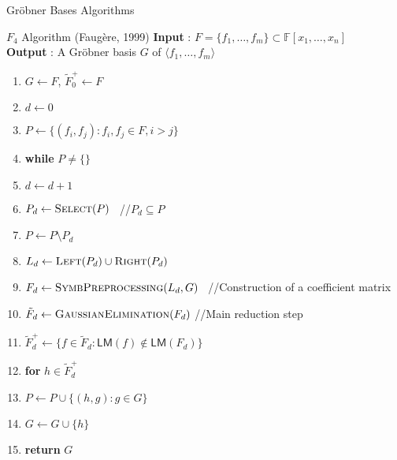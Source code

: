 \documentclass{beamer}
\newcommand{\Field}{\mathbb{F}}
\newcommand{\Ideal}[1]{\langle #1 \rangle}
\newcommand{\LM}[1]{\mathsf{LM}(#1)}
\newcommand{\mpolyring}[3]{#1[#2_{1}, \ldots, #2_{#3}]}
\newcommand{\Grobner}{Gr\"{o}bner }
\begin{document}
\begin{section}{\Grobner Bases Algorithms}
\begin{frame}{$F_4$ Algorithm (Faug\`{e}re, 1999)}
  \textbf{Input} : $F = \{ f_1, \ldots, f_m \} \subset \mpolyring{\Field}{x}{n}$\\
  \textbf{Output} : A \Grobner basis $G$ of $\Ideal{f_1, \ldots, f_m}$
  \begin{footnotesize}
    \begin{enumerate}
    \item<2-> $G \leftarrow F$, $\tilde{F}_{0}^{+} \leftarrow F$
    \item<3-> $d \leftarrow 0$
    \item<4-> $P \leftarrow \{ ( f_i, f_j ) : f_i, f_j \in F, i > j\}$
    \item<5-> \textbf{while} $P \neq \{ \}$
    \item<6-> \quad $d \leftarrow d + 1$
    \item<7-> \quad $P_d \leftarrow \textsc{Select}(P)$ \qquad \qquad
      \qquad \qquad \qquad \ //$P_d \subseteq P$
    \item<8-> \quad $P \leftarrow P \setminus P_d$
    \item<9-> \quad
      $L_d \leftarrow \textsc{Left}(P_d) \cup \textsc{Right}(P_d)$
    \item<10-> \quad
      $F_d \leftarrow \textsc{SymbPreprocessing}(L_d, G)$ \qquad
      \ //Construction of a coefficient matrix
    \item<11-> \quad
      $\tilde{F}_d \leftarrow \textsc{GaussianElimination}(F_d)$
      \qquad \quad //Main reduction step
    \item<12-> \quad
      $\tilde{F}_{d}^{+} \leftarrow \{ f \in \tilde{F}_d : \LM{f}
      \not\in \LM{F_d} \}$
    \item<13-> \quad \textbf{for} $h \in \tilde{F}_{d}^{+}$
    \item<14-> \qquad $P \leftarrow P \cup \{ (h, g) : g \in G\}$
    \item<15-> \qquad $G \leftarrow G \cup \{ h \}$
    \item<16-> \textbf{return} $G$
    \end{enumerate}
  \end{footnotesize}

  
  
\end{frame}


\end{section}
\end{document}

